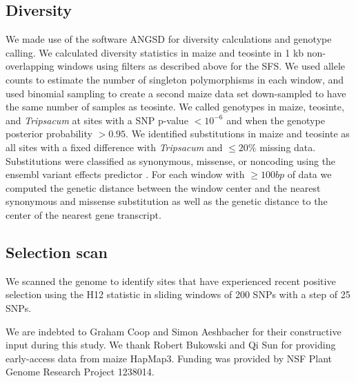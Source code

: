 \documentclass{pnastwo}
\begin{document}
\begin{article}
\begin{materials}
\subsection{Diversity}
We made use of the software ANGSD \cite{korneliussen2014} for diversity calculations and genotype calling. 
We calculated diversity statistics in maize and teosinte in 1 kb non-overlapping windows using filters as described above for the SFS. 
We used allele counts to estimate the number of singleton polymorphisms in each window, and used binomial sampling to create a second maize data set down-sampled to have the same number of samples as teosinte.
We called genotypes in maize, teosinte, and \emph{Tripsacum} at sites with a SNP p-value $<10^{-6}$ and when the genotype posterior probability $>0.95$.
We identified substitutions in maize and teosinte as all sites with a fixed difference with \emph{Tripsacum} and $\leq 20\%$ missing data. 
Substitutions were classified as synonymous, missense, or noncoding using the ensembl variant effects predictor \cite{mclaren2010}.
For each window with $\geq 100bp$ of data we computed the genetic distance between the window center and the nearest synonymous and missense substitution as well as the genetic distance to the center of the nearest gene transcript.  

\subsection{Selection scan}
We scanned the genome to identify sites that have experienced recent positive selection using the H12 statistic \cite{garud2015} in sliding windows of 200 SNPs with a step of 25 SNPs.


\end{materials}

\begin{acknowledgments}
We are indebted to Graham Coop and Simon Aeshbacher for their constructive input during this study. We thank Robert Bukowski and Qi Sun for providing early-access data from maize HapMap3. Funding was provided by NSF Plant Genome Research Project 1238014.
\end{acknowledgments}



\onecolumn
 


\end{article}
\end{document}
